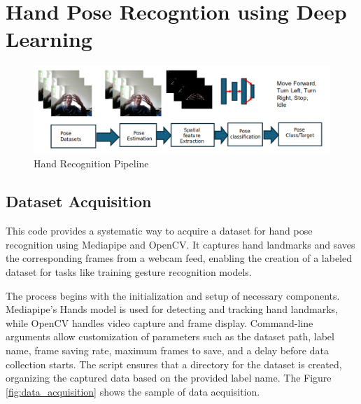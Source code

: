 
\chapter{Hand Pose Recogntion using Deep Learning}
\begin{figure}[h!]
	\centering
	\includegraphics[width=\linewidth]{img/pose_pipeline} %
	\caption{Hand Recognition Pipeline}
	\label{fig:pose_pipeline} %
\end{figure}

\section{Dataset Acquisition}
This code provides a systematic way to acquire a dataset for hand pose recognition using Mediapipe and OpenCV. It captures hand landmarks and saves the corresponding frames from a webcam feed, enabling the creation of a labeled dataset for tasks like training gesture recognition models.

The process begins with the initialization and setup of necessary components. Mediapipe's Hands model is used for detecting and tracking hand landmarks, while OpenCV handles video capture and frame display. Command-line arguments allow customization of parameters such as the dataset path, label name, frame saving rate, maximum frames to save, and a delay before data collection starts. The script ensures that a directory for the dataset is created, organizing the captured data based on the provided label name. The Figure \ref{fig:data_acquisition} shows the sample of data acquisition.

